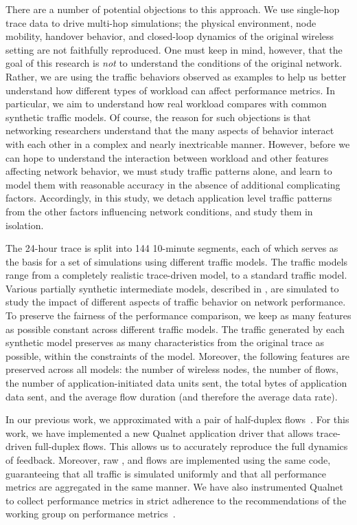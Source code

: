 \documentclass[twocolumn,final]{svjour3}
\begin{document}
There are a number of potential objections to this approach. We use single-hop trace data to drive multi-hop simulations; the physical environment, node mobility, handover behavior, and closed-loop dynamics of the original wireless setting are not faithfully reproduced. One must keep in mind, however, that the goal of this research is \textit{not} to understand the conditions of the original network. Rather, we are using the traffic behaviors observed as examples to help us better understand how different types of workload can affect performance metrics. In particular, we aim to understand how real workload compares with common synthetic traffic models. Of course, the reason for such objections is that networking researchers understand that the many aspects of behavior interact with each other in a complex and nearly inextricable manner. However, before we can hope to understand the interaction between workload and other features affecting network behavior, we must study traffic patterns alone, and learn to model them with reasonable accuracy in the absence of additional complicating factors. Accordingly, in this study, we detach application level traffic patterns from the other factors influencing network conditions, and study them in isolation.

The 24-hour trace is split into 144 10-minute segments, each of which serves as the basis for a set of simulations using different traffic models. The traffic models range from a completely realistic trace-driven model, to a standard  traffic model. Various partially synthetic intermediate models, described in , are simulated to study the impact of different aspects of traffic behavior on network performance. To preserve the fairness of the performance comparison, we keep as many features as possible constant across different traffic models. The traffic generated by each synthetic model preserves as many characteristics from the original trace as possible, within the constraints of the model. Moreover, the following features are preserved across all models: the number of wireless nodes, the number of flows, the number of application-initiated data units sent, the total bytes of application data sent, and the average flow duration (and therefore the average data rate).

In our previous work, we approximated  with a pair of half-duplex  flows~\cite{Karpinski07:realism,Karpinski07:cbr-failure}. For this work, we have implemented a new Qualnet application driver that allows trace-driven full-duplex  flows. This allows us to accurately reproduce the full dynamics of  feedback. Moreover, raw ,  and  flows are implemented using the same code, guaranteeing that all traffic is simulated uniformly and that all performance metrics are aggregated in the same manner. We have also instrumented Qualnet to collect  performance metrics in strict adherence to the recommendations of the  working group on  performance metrics~\cite{rfc:ip-metrics}.
\end{document}
